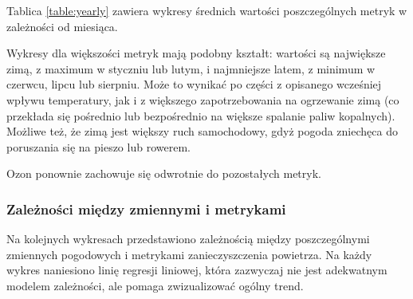 \documentclass[18pt, letterpaper]{article}
\begin{document}
Tablica \ref{table:yearly} zawiera wykresy średnich wartości poszczególnych metryk w zależności od miesiąca. 

Wykresy dla większości metryk mają podobny kształt: wartości są największe zimą, z maximum w styczniu lub lutym, i najmniejsze latem, z minimum w czerwcu, lipcu lub sierpniu. Może to wynikać po części z opisanego wcześniej wpływu temperatury, jak i z większego zapotrzebowania na ogrzewanie zimą (co przekłada się pośrednio lub bezpośrednio na większe spalanie paliw kopalnych). Możliwe też, że zimą jest większy ruch samochodowy, gdyż pogoda zniechęca do poruszania się na pieszo lub rowerem. 

Ozon ponownie zachowuje się odwrotnie do pozostałych metryk.

\subsubsection{Zależności między zmiennymi i metrykami}
Na kolejnych wykresach przedstawiono zależnością między poszczególnymi zmiennych pogodowych i metrykami zanieczyszczenia powietrza. Na każdy wykres naniesiono linię regresji liniowej, która zazwyczaj nie jest adekwatnym modelem zależności, ale pomaga zwizualizować ogólny trend.
\end{document}
